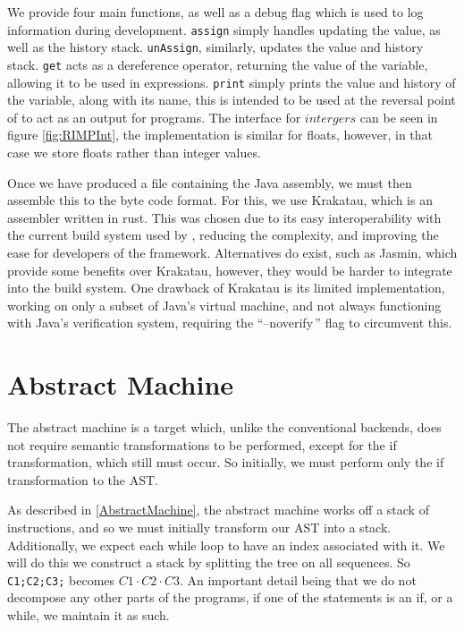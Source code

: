 We provide four main functions, as well as a debug flag which is used to log information during \rimp development. \lstinline{assign} simply handles updating the value, as well as the history stack. \lstinline{unAssign}, similarly, updates the value and history stack. \lstinline{get} acts as a dereference operator, returning the value of the variable, allowing it to be used in expressions. \lstinline{print} simply prints the value and history of the variable, along with its name, this is intended to be used at the reversal point of \rimp to act as an output for programs. The interface for $intergers$ can be seen in figure \ref{fig:RIMPInt}, the implementation is similar for floats, however, in that case we store floats rather than integer values.

Once we have produced a file containing the Java assembly, we must then assemble this to the byte code format. For this, we use Krakatau\cite{Krakatau}, which is an assembler written in rust. This was chosen due to its easy interoperability with the current build system used by \rimp, reducing the complexity, and improving the ease for developers of the framework. Alternatives do exist, such as Jasmin\cite{Jasmin}, which provide some benefits over Krakatau, however, they would be harder to integrate into the build system. One drawback of Krakatau is its limited implementation, working on only a subset of Java's virtual machine, and not always functioning with Java's verification system, requiring the ``--noverify\,'' flag to circumvent this.


\section{Abstract Machine}

The abstract machine is a target which, unlike the conventional backends, does not require semantic transformations to be performed, except for the if transformation, which still must occur. So initially, we must perform only the if transformation to the AST.

As described in \ref{AbstractMachine}, the abstract machine works off a stack of instructions, and so we must initially transform our AST into a stack. Additionally, we expect each while loop to have an index associated with it. We will do this we construct a stack by splitting the tree on all sequences. So \lstinline{C1;C2;C3;} becomes $C1 \cdot C2 \cdot C3$. An important detail being that we do not decompose any other parts of the programs, if one of the statements is an if, or a while, we maintain it as such.

